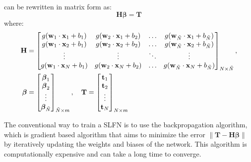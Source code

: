  can be rewritten in matrix form as:
\begin{equation}
    \textbf{H}\boldsymbol\beta = \textbf{T}
\end{equation}
where:
\begin{align}
    \textbf H        & = \begin{bmatrix}
                             g(\textbf w_1 \cdot \textbf x_1 + b_1) & g(\textbf w_2 \cdot \textbf x_1 + b_2) & \dots  & g(\textbf w_{\tilde{N}} \cdot \textbf x_1 + b_{\tilde{N}}) \\
                             g(\textbf w_1 \cdot \textbf x_2 + b_1) & g(\textbf w_2 \cdot \textbf x_2 + b_2) & \dots  & g(\textbf w_{\tilde{N}} \cdot \textbf x_2 + b_{\tilde{N}}) \\
                             \vdots                                 & \vdots                                 & \ddots & \vdots                                                     \\
                             g(\textbf w_1 \cdot \textbf x_N + b_1) & g(\textbf w_2 \cdot \textbf x_N + b_2) & \dots  & g(\textbf w_{\tilde{N}} \cdot \textbf x_N + b_{\tilde{N}})
                         \end{bmatrix}_{N \times \tilde{N}}, \\
    \boldsymbol\beta & = \begin{bmatrix}
                             \boldsymbol\beta_1 \\
                             \boldsymbol\beta_2 \\
                             \vdots             \\
                             \boldsymbol\beta_{\tilde{N}}
                         \end{bmatrix}_{\tilde{N} \times m}, \quad
    \textbf T = \begin{bmatrix}
                    \textbf t_1 \\
                    \textbf t_2 \\
                    \vdots      \\
                    \textbf t_N
                \end{bmatrix}_{N \times m}
\end{align}

The conventional way to train a SLFN is to use the backpropagation algorithm,
which is gradient based algorithm that aims to minimize the error $\left\lVert
    \textbf{T} - \textbf{H}\boldsymbol\beta \right\rVert$ by iteratively updating
the weights and biases of the network. This algorithm is computationally
expensive and can take a long time to converge.

